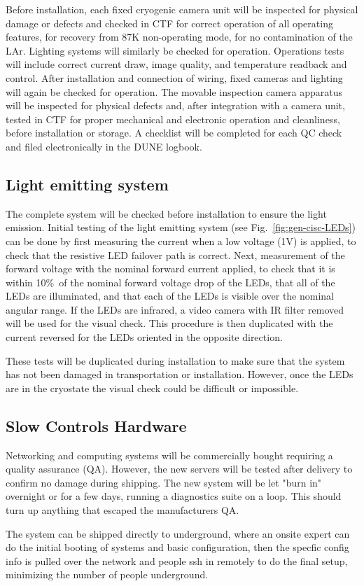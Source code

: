 Before installation, each fixed cryogenic camera unit will be inspected for physical damage or defects and checked in CTF for correct operation of all operating features, for recovery from 87K non-operating mode, for no contamination of the LAr. Lighting systems will similarly be checked for operation. Operations tests will include correct current draw, image quality, and temperature readback and control. After installation and connection of wiring, fixed cameras and lighting will again be checked for operation. The movable inspection camera apparatus will be inspected for physical defects and, after integration with a camera unit, tested in CTF for proper mechanical and electronic operation and cleanliness, before installation or storage. A checklist will be completed for each QC check and filed electronically in the DUNE logbook. 

\subsection{Light emitting system}
\label{sec:fdgen-slow-cryo-qc-les}

The complete system will be checked before installation to ensure the light emission. 
Initial testing of the light emitting system (see Fig.~\ref{fig:gen-cisc-LEDs}) can be done by first
measuring the current when a low voltage (1V) is applied, to check
that the resistive LED failover path is correct. Next, measurement
of the forward voltage with the nominal forward current applied, to
check that it is within 10\%\ of the nominal forward voltage drop of
the LEDs, that all of the LEDs are illuminated, and that each of the
LEDs is visible over the nominal angular range. If the LEDs are
infrared, a video camera with IR filter removed will be used for the
visual check. This procedure is then duplicated with the current
reversed for the LEDs oriented in the opposite direction.  

These tests will be duplicated during
installation to make sure that the system has
not been damaged in transportation or installation. However, once
the LEDs are in the cryostate the visual check could be difficult or impossible.


\subsection{Slow Controls Hardware}
\label{sec:fdgen-slow-cryo-qc-sc-hard}

Networking and computing systems will be commercially bought requiring a quality assurance (QA). However, the new servers will be tested after delivery to confirm no damage during shipping. The new system will be let "burn in" overnight or for a few days, running a diagnostics suite on a loop. This should turn up anything that escaped the manufacturers QA.

The system can be shipped directly to underground, where an onsite expert can do the initial booting of systems and basic configuration, then the specfic
config info is pulled over the network and people ssh in remotely to do
the final setup, minimizing the number of people underground.

 
